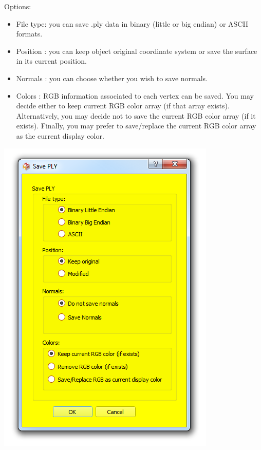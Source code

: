 \begin{minipage}{0.5\textwidth}
Options:
\begin{itemize}
\item File type: you can save .ply data in binary (little or big endian)
or ASCII formats.
\item Position : you can keep object original coordinate system or
save the surface in its current position.
\item Normals : you can choose whether you wish to save normals.
\item Colors : RGB information associated to each vertex can be saved. You may decide either to keep current RGB color array (if that array exists). Alternatively, you may decide not to save the current RGB color array (if it exists). Finally, you may prefer to save/replace the current RGB color array as the current display color.
\end{itemize}

\end{minipage}    
\begin{minipage}{0.5\textwidth}\centering
  \includegraphics[scale=0.45]{images/07/surface/save_ply.png}
 \end{minipage} 

